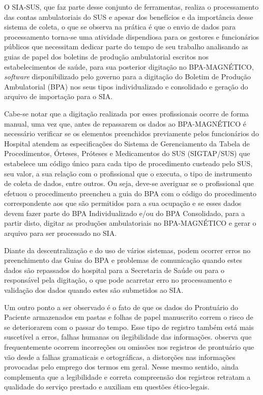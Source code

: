 O SIA-SUS, que faz parte desse conjunto de ferramentas, realiza o processamento das contas ambulatoriais do SUS e apesar dos benefícios e da importância desse sistema de coleta, o que se observa na prática é que o envio de dados para processamento torna-se uma atividade dispendiosa para os gestores e funcionários públicos que necessitam dedicar parte do tempo de seu trabalho analisando as guias de papel dos boletins de produção ambulatorial escritos nos estabelecimentos de saúde, para sua posterior digitação no BPA-MAGNÉTICO, \textit{software} disponibilizado pelo governo para a digitação do Boletim de Produção Ambulatorial (BPA) nos seus tipos individualizado e consolidado e geração do arquivo de importação para o SIA.

Cabe-se notar que a digitação realizada por esses profissionais ocorre de forma manual, uma vez que, antes de repassarem os dados ao BPA-MAGNÉTICO é necessário verificar se os elementos preenchidos previamente pelos funcionários do Hospital atendem as especificações do Sistema de Gerenciamento da Tabela de Procedimentos, Órteses, Próteses e Medicamentos do SUS (SIGTAP/SUS) que estabelece um código único para cada tipo de procedimento custeado pelo SUS, seu valor, a sua relação com o profissional que o executa, o tipo de instrumento de coleta de dados, entre outros. Ou seja, deve-se averiguar se o profissional que efetuou o procedimento preencheu a guia do BPA com o código do procedimento correspondente aos que são permitidos para a sua ocupação e se esses dados devem fazer parte do BPA Individualizado e/ou do BPA Consolidado, para a partir disto, digitar as produções ambulatoriais no BPA-MAGNÉTICO e gerar o arquivo para ser processado no SIA.

Diante da descentralização e do uso de vários sistemas, podem ocorrer erros no preenchimento das Guias do BPA e problemas de comunicação quando estes dados são repassados do hospital para a Secretaria de Saúde ou para o responsável pela digitação, o que pode acarretar erro no processamento e validação dos dados quando estes são submetidos ao SIA.

Um outro ponto a ser observado é o fato de que os dados do Prontuário do Paciente armazenados em pastas e folhas de papel manuscrito correm o risco de se deteriorarem com o passar do tempo. Esse tipo de registro também está mais suscetível a erros, falhas humanas ou ilegibilidade das informações.  observa que frequentemente ocorrem incorreções ou omissões nos registros de prontuário que vão desde a falhas gramaticais e ortográficas, a distorções nas informações provocadas pelo emprego dos termos em geral. Nesse mesmo sentido, ainda complementa que a legibilidade e correta compreensão dos registros retratam a qualidade do serviço prestado e auxiliam em questões ético-legais.

